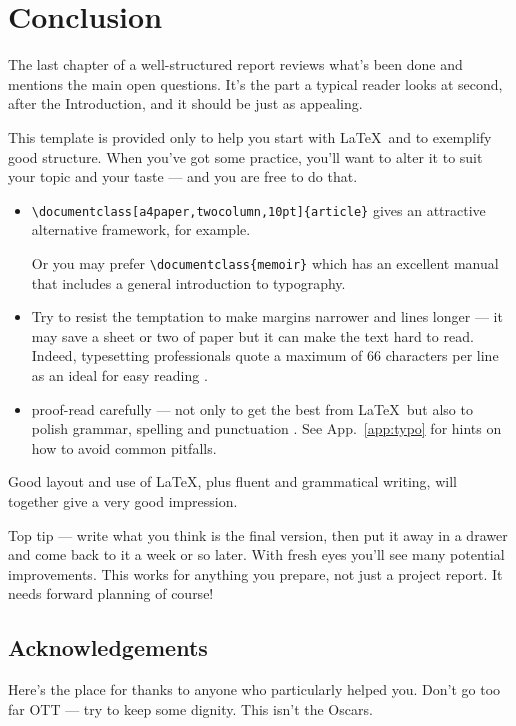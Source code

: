 \chapter{Conclusion}\label{andfinally}
The last chapter of a well-structured report reviews what's been done and
mentions the main open questions.  It's the part a typical reader looks
at second, after the Introduction, and it should be just as appealing.
\par
This template is provided only to help you start with \LaTeX\ and to
exemplify good structure. When you've got some practice, you'll want to
alter it to suit your topic and your taste --- and you are free to do
that.
\begin{itemize}
    \item\verb+\documentclass[a4paper,twocolumn,10pt]{article}+
    gives an attractive alternative framework, for example.\par Or you
may prefer \verb+\documentclass{memoir}+ which has an excellent
manual \cite{MEM} that includes a general introduction to typography.
    \item Try to resist the temptation to make margins narrower
    and lines longer --- it may save a sheet or two of paper but it
    can make the text hard to read. Indeed, typesetting professionals 
    quote a maximum of 66 characters per line as an ideal for easy reading
          \cite[Sec.~5.2.2]{NSS}.
    \item proof-read carefully --- not only to get the best from \LaTeX\
but also to polish grammar, spelling and punctuation \cite{ESL}. See
App.~\ref{app:typo} for hints on how to avoid common pitfalls.
\end{itemize}
Good layout and use of \LaTeX, plus fluent and grammatical writing, will
together give a very good impression.
\par
Top tip --- write what you think is the final version, then put it
away in a drawer and come back to it a week or so later. With fresh
eyes you'll see many potential improvements. This works for anything you
prepare, not just a project report. It needs forward planning of
course!
\section*{Acknowledgements}
Here's the place for thanks to anyone who particularly helped you.
Don't go too far OTT --- try to keep some dignity. This isn't the 
Oscars.

